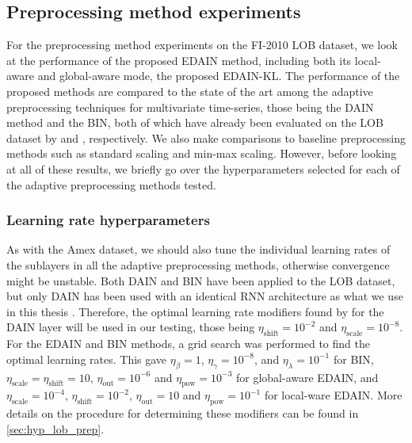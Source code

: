 \documentclass{statsmsc}
\begin{document}
{%

\subsection{Preprocessing method experiments}%
\label{sub:Preprocessing method experiments}

For the preprocessing method experiments on the FI-2010 \ac{LOB} dataset, we look at the
performance of the proposed \ac{EDAIN} method, including both its local-aware and global-aware
mode, the proposed \ac{EDAIN-KL}. The performance of the proposed methods
are compared to the state of the art among
the adaptive preprocessing techniques for multivariate time-series, those being the
\ac{DAIN} method and the \ac{BIN}, both of which have already been evaluated on the \ac{LOB}
dataset by \cite{dain} and \cite{bin}, respectively. We also make comparisons to baseline
preprocessing methods such as standard scaling and min-max scaling. However, before looking
at all of these results, we briefly go over the hyperparameters selected for each of the
adaptive preprocessing methods tested.

\subsubsection{Learning rate hyperparameters}%
\label{ssub:Learning rate tuning}

As with the Amex dataset, we should also tune the individual learning rates of the sublayers in
all the adaptive preprocessing methods, otherwise convergence might be unstable.
Both \ac{DAIN} and \ac{BIN} have been applied to the \ac{LOB} dataset, but only \ac{DAIN} has been
used with an identical \ac{RNN} architecture as what we use in this thesis \citep{dain}. Therefore, the
optimal learning rate modifiers found by \cite{dain} for the \ac{DAIN} layer will be used
in our testing, those being $\eta_{\textrm{shift}}=10^{-2}$ and $\eta_{\textrm{scale}}=10^{-8}$.
For the \ac{EDAIN} and  \ac{BIN} methods, a grid search was performed to find the optimal learning
rates. This gave $\eta_\beta=1$, $\eta_\gamma=10^{-8}$, and $\eta_\lambda=10^{-1}$ for \ac{BIN},
$\eta_{\textrm{scale}}=\eta_{\textrm{shift}}=10$, $\eta_{\textrm{out}}=10^{-6}$ and $\eta_{\textrm{pow}}=10^{-3}$ for
global-aware \ac{EDAIN}, and
$\eta_{\textrm{scale}}=10^{-4}$, $\eta_{\textrm{shift}}=10^{-2}$, $\eta_{\textrm{out}}=10$ and $\eta_{\textrm{pow}}=10^{-1}$ for
local-ware \ac{EDAIN}.
More details on the procedure for determining these modifiers can be found in \cref{sec:hyp_lob_prep}.

}
\end{document}
